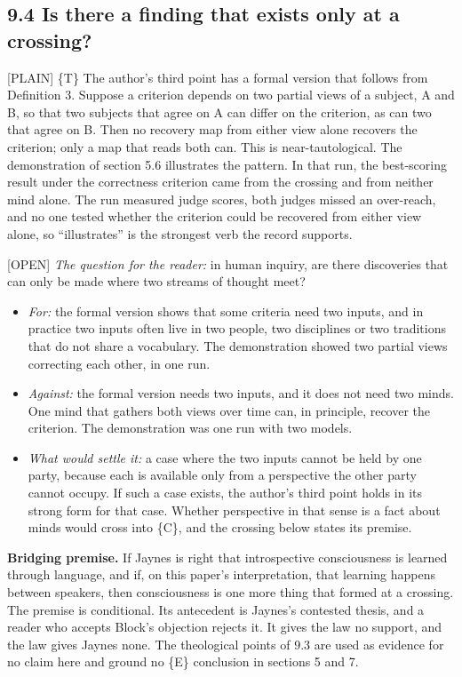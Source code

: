 \documentclass[11pt]{article}
\newcommand{\register}[1]{{\ttfamily\small #1}}
\begin{document}
\subsection*{9.4 Is there a finding that exists only at a crossing?}

\register{[PLAIN]} \{T\} The author's third point has a formal version that follows from Definition 3. Suppose a criterion depends on two partial views of a subject, A and B, so that two subjects that agree on A can differ on the criterion, as can two that agree on B. Then no recovery map from either view alone recovers the criterion; only a map that reads both can. This is near-tautological. The demonstration of section 5.6 illustrates the pattern. In that run, the best-scoring result under the correctness criterion came from the crossing and from neither mind alone. The run measured judge scores, both judges missed an over-reach, and no one tested whether the criterion could be recovered from either view alone, so ``illustrates'' is the strongest verb the record supports.

\register{[OPEN]} \emph{The question for the reader:} in human inquiry, are there discoveries that can only be made where two streams of thought meet?

\begin{itemize}
\item \emph{For:} the formal version shows that some criteria need two inputs, and in practice two inputs often live in two people, two disciplines or two traditions that do not share a vocabulary. The demonstration showed two partial views correcting each other, in one run.
\item \emph{Against:} the formal version needs two inputs, and it does not need two minds. One mind that gathers both views over time can, in principle, recover the criterion. The demonstration was one run with two models.
\item \emph{What would settle it:} a case where the two inputs cannot be held by one party, because each is available only from a perspective the other party cannot occupy. If such a case exists, the author's third point holds in its strong form for that case. Whether perspective in that sense is a fact about minds would cross into \{C\}, and the crossing below states its premise.
\end{itemize}
\textbf{Bridging premise.} If Jaynes is right that introspective consciousness is learned through language, and if, on this paper's interpretation, that learning happens between speakers, then consciousness is one more thing that formed at a crossing. The premise is conditional. Its antecedent is Jaynes's contested thesis, and a reader who accepts Block's objection rejects it. It gives the law no support, and the law gives Jaynes none. The theological points of 9.3 are used as evidence for no claim here and ground no \{E\} conclusion in sections 5 and 7.
\end{document}
